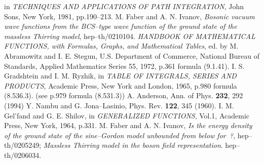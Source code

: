 \documentclass[a4paper,12pt] {article}
\begin{document}
\begin{thebibliography}{9}
in {\it TECHNIQUES AND APPLICATIONS OF PATH INTEGRATION},
John \myHighlight{$\,\&\,$}\coordHE{} Sons, New York, 1981, pp.190--213.
%
M. Faber and A. N. Ivanov,
{\it Bosonic vacuum wave functions from the BCS--type wave function
of the ground state of the massless Thirring model},
hep--th/0210104.
%
{\it HANDBOOK OF MATHEMATICAL FUNCTIONS, with Formulas,
Graphs, and Mathematical Tables}, ed. by M. Abramowitz and
I. E. Stegun, U.S. Department of Commerce, National Bureau of
Standards, Applied Mathematics Series \myHighlight{$\bullet$}\coordHE{} 55, 1972,
p.361 formula (9.1.41).
%
I. S. Gradshtein and I. M. Ryzhik,
in {\it TABLE OF INTEGRALS, SERIES AND PRODUCTS},
Academic Press, New York and London, 1965, p.980 formula (8.536.3).
(see \cite{th0210104} p.979 formula (8.531.3))
%
A. Anderson,
Ann. of Phys. {\bf 232}, 292 (1994)
%
Y. Nambu and G. Jona--Lasinio,
Phys. Rev. {\bf 122}, 345 (1960).
%
I. M. Gel'fand and G. E. Shilov,
in {\it GENERALIZED FUNCTIONS}, Vol.1, Academic Press,
New York, 1964, p.331.
%
M. Faber and A. N. Ivanov, 
{\it Is the energy density of the ground state of the sine--Gordon
model unbounded from below for \coordHE{}\,?}, hep--th/0205249;
{\it Massless Thirring model in the boson field representation}.
hep--th/0206034.
\end{thebibliography}
\end{document}

